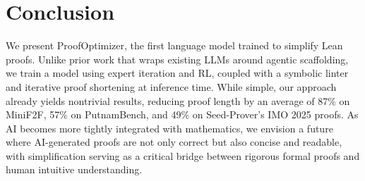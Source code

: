 \section{Conclusion}
We present ProofOptimizer, the first language model trained to simplify Lean proofs. 
Unlike prior work that wraps existing LLMs around agentic scaffolding, we train a model using expert iteration and RL, coupled with a symbolic linter and iterative proof shortening at inference time. 
While simple, our approach already yields nontrivial results, reducing proof length by an average of 87\% on MiniF2F, 57\% on PutnamBench, and 49\% on Seed-Prover’s IMO 2025 proofs. 
As AI becomes more tightly integrated with mathematics, we envision a future where AI-generated proofs are not only correct but also concise and readable, with simplification serving as a critical bridge between rigorous formal proofs and human intuitive understanding.
